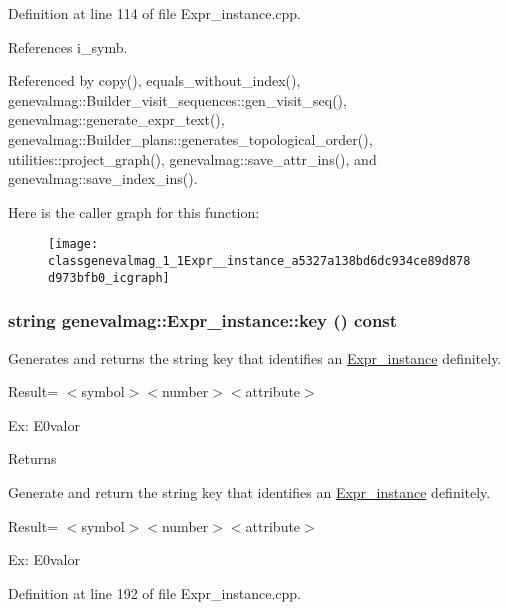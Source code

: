 Definition at line 114 of file Expr\_\-instance.cpp.



References i\_\-symb.



Referenced by copy(), equals\_\-without\_\-index(), genevalmag::Builder\_\-visit\_\-sequences::gen\_\-visit\_\-seq(), genevalmag::generate\_\-expr\_\-text(), genevalmag::Builder\_\-plans::generates\_\-topological\_\-order(), utilities::project\_\-graph(), genevalmag::save\_\-attr\_\-ins(), and genevalmag::save\_\-index\_\-ins().



Here is the caller graph for this function:\nopagebreak
\begin{figure}[H]
\begin{center}
\leavevmode
\texttt{[image: classgenevalmag\_1\_1Expr\_\_instance\_a5327a138bd6dc934ce89d878d973bfb0\_icgraph]}
\end{center}
\end{figure}


\hypertarget{classgenevalmag_1_1Expr__instance_a0a08cd791001f10ccb4020c5b9279823}{
\subsubsection[{key}]{\setlength{\rightskip}{0pt plus 5cm}string genevalmag::Expr\_\-instance::key () const}}
\label{classgenevalmag_1_1Expr__instance_a0a08cd791001f10ccb4020c5b9279823}
Generates and returns the string key that identifies an \hyperlink{classgenevalmag_1_1Expr__instance}{Expr\_\-instance} definitely.\par
 \par
 Result= $<$symbol$>$$<$number$>$$<$attribute$>$\par
 \par
 Ex: E0valor\par
 \begin{DoxyReturn}{Returns}

\end{DoxyReturn}
Generate and return the string key that identifies an \hyperlink{classgenevalmag_1_1Expr__instance}{Expr\_\-instance} definitely.

Result= $<$symbol$>$$<$number$>$$<$attribute$>$

Ex: E0valor 

Definition at line 192 of file Expr\_\-instance.cpp.




